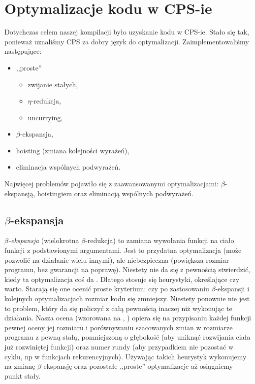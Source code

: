 \documentclass[11pt]{scrartcl}
\begin{document}
\section{Optymalizacje kodu w CPS-ie}
Dotychczas celem naszej kompilacji było uzyskanie kodu w CPS-ie. Stało się tak,
ponieważ uznaliśmy CPS za dobry język do optymalizacji. Zaimplementowaliśmy
następujące:
\begin{itemize}
\item ,,proste'' \begin{itemize}
  \item zwijanie stałych,
  \item $\eta$-redukcja,
  \item uncurrying,
  \end{itemize}
\item $\beta$-ekspansja,
\item hoisting (zmiana kolejności wyrażeń),
\item eliminacja wspólnych podwyrażeń.
\end{itemize}

Najwięcej problemów
pojawiło się z zaawansowanymi optymalizacjami: $\beta$-ekspansją, hoistingiem oraz
eliminacją wspólnych podwyrażeń.

\subsection{$\beta$-ekspansja}
\textit{$\beta$-ekspansja} (wielokrotna $\beta$-redukcja) to zamiana wywołania funkcji na ciało funkcji z
podstawionymi argumentami. Jest to przydatna optymalizacja (może pozwolić na
działanie wielu innymi), ale niebezpieczna (powiększa rozmiar programu, bez
gwarancji na poprawę). Niestety nie da się z pewnością stwierdzić, kiedy ta
optymalizacja coś da \cite[Chapter 7.1: When to do in-line expansion]{Appel}. Dlatego stosuje się heurystyki, określające czy
warto. Starają się one ocenić proste kryterium: czy po zastosowaniu $\beta$-ekspansji
i kolejnych optymalizacjach rozmiar kodu się zmniejszy. Niestety ponownie nie
jest to problem, który da się policzyć z całą pewnością inaczej niż wykonując te
działania. Nasza ocena (wzorowana na \cite[Chapter 7.2: Estimating the
savings]{Appel}, \cite[Chapter 7.3: Runaway Expansion]{Appel}) opiera się na przypisaniu
każdej funkcji pewnej oceny jej rozmiaru i porównywaniu szacowanych zmian w
rozmiarze programu z pewną stałą, pomniejszoną o głębokość (aby uniknąć
rozwijania ciała już rozwiniętej funkcji) oraz numer rundy (aby przypadkiem nie
pozostać w cyklu, np w funkcjach rekurencyjnych). Używając takich heurystyk
wykonujemy na zmianę $\beta$-ekspansję oraz pozostałe ,,proste'' optymalizacje
aż osiągniemy punkt stały.
\end{document}
